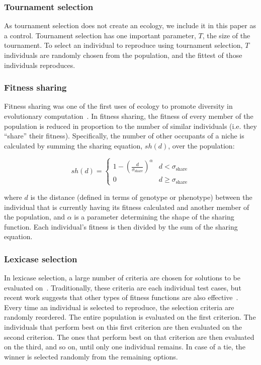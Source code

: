 \subsubsection{Tournament selection}
As tournament selection does not create an ecology, we include it in this paper as a control. Tournament selection has one important parameter, $T$, the size of the tournament. To select an individual to reproduce using tournament selection, $T$ individuals are randomly chosen from the population, and the fittest of those individuals reproduces.


\subsubsection{Fitness sharing}

Fitness sharing was one of the first uses of ecology to promote diversity in evolutionary computation~\cite{goldberg_genetic_1987}. In fitness sharing, the fitness of every member of the population is reduced in proportion to the number of similar individuals (i.e. they ``share'' their fitness). Specifically, the number of other occupants of a niche is calculated by summing the sharing equation, $sh(d)$, over the population:

\begin{equation} sh(d) =    \begin{cases}
      1 - (\frac{d}{\sigma_{\text{share}}})^{\alpha} & d < \sigma_{\text{share}}\\
      0 &  d \geq \sigma_{\text{share}}  
   \end{cases}
\label{eq:fit_share}
\end{equation}

where $d$ is the distance (defined in terms of genotype or phenotype) between the individual that is currently having its fitness calculated and another member of the population, and $\alpha$ is a parameter determining the shape of the sharing function. Each individual's fitness is then divided by the sum of the sharing equation.

\subsubsection{Lexicase selection}

In lexicase selection, a large number of criteria are chosen for solutions to be evaluated on~\cite{spector_assessment_2012}. Traditionally, these criteria are each individual test cases, but recent work suggests that other types of fitness functions are also effective~\cite{dolson_applying_2018}. Every time an individual is selected to reproduce, the selection criteria are randomly reordered. The entire population is evaluated on the first criterion. The individuals that perform best on this first criterion are then evaluated on the second criterion. The ones that perform best on that criterion are then evaluated on the third, and so on, until only one individual remains. In case of a tie, the winner is selected randomly from the remaining options.

